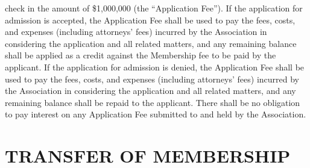 \documentclass[]{book}
\theoremstyle{definition}
\theoremstyle{definition}
\theoremstyle{definition}
\theoremstyle{remark}
\begin{document}
\begin{enumerate}
  check in the amount of \$1,000,000 (the ``Application Fee''). If the
  application for admission is accepted, the Application Fee shall be
  used to pay the fees, costs, and expenses (including attorneys' fees)
  incurred by the Association in considering the application and all
  related matters, and any remaining balance shall be applied as a
  credit against the Membership fee to be paid by the applicant. If the
  application for admission is denied, the Application Fee shall be used
  to pay the fees, costs, and expenses (including attorneys' fees)
  incurred by the Association in considering the application and all
  related matters, and any remaining balance shall be repaid to the
  applicant. There shall be no obligation to pay interest on any
  Application Fee submitted to and held by the Association.
\end{enumerate}

\section{TRANSFER OF MEMBERSHIP}\label{transfer-of-membership}
\end{document}
